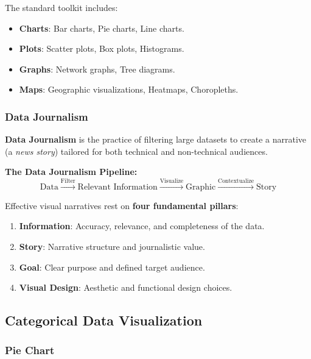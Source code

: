 The standard toolkit includes:
\begin{itemize}
    \item \textbf{Charts}: Bar charts, Pie charts, Line charts.
    \item \textbf{Plots}: Scatter plots, Box plots, Histograms.
    \item \textbf{Graphs}: Network graphs, Tree diagrams.
    \item \textbf{Maps}: Geographic visualizations, Heatmaps, Choropleths.
\end{itemize}

\subsubsection{Data Journalism}

\textbf{Data Journalism} is the practice of filtering large datasets to create a narrative (a \textit{news story}) tailored for both technical and non-technical audiences. 

\textbf{The Data Journalism Pipeline:}
$$\text{Data} \xrightarrow{\text{Filter}} \text{Relevant Information} \xrightarrow{\text{Visualize}} \text{Graphic} \xrightarrow{\text{Contextualize}} \text{Story}$$

Effective visual narratives rest on \textbf{four fundamental pillars}:
\begin{enumerate}
    \item \textbf{Information}: Accuracy, relevance, and completeness of the data.
    \item \textbf{Story}: Narrative structure and journalistic value.
    \item \textbf{Goal}: Clear purpose and defined target audience.
    \item \textbf{Visual Design}: Aesthetic and functional design choices.
\end{enumerate}

\subsection{Categorical Data Visualization}

\subsubsection{Pie Chart}


